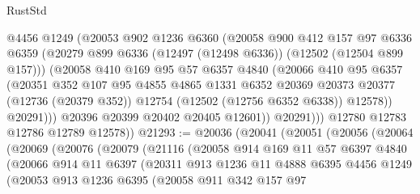 \begin{lexlean}{RustStd}
\begin{coremodule}
                  @4456
                  @1249
                  (@20053
                    @902
                    @1236
                    @6360
                    (@20058
                      @900
                      @412
                      @157
                      @97
                      @6336
                      @6359
                      (@20279 @899 @6336 (@12497 (@12498 @6336)) (@12502 (@12504 @899 @157)))
                      (@20058
                        @410
                        @169
                        @95
                        @57
                        @6357
                        @4840
                        (@20066
                          @410
                          @95
                          @6357
                          (@20351
                            @352
                            @107
                            @95
                            @4855
                            @4865
                            @1331
                            @6352
                            @20369
                            @20373
                            @20377
                            (@12736 (@20379 @352))
                            @12754
                            (@12502 (@12756 @6352 @6338))
                            @12578))
                        @20291)))
                  @20396
                  @20399
                  @20402
                  @20405
                  @12601))
              @20291)))
        @12780
        @12783
        @12786
        @12789
        @12578))
@21293 := @20036
    (@20041
      (@20051
        (@20056
          (@20064
            (@20069
              (@20076
                (@20079
                  (@21116
                    (@20058
                      @914
                      @169
                      @11
                      @57
                      @6397
                      @4840
                      (@20066
                        @914
                        @11
                        @6397
                        (@20311
                          @913
                          @1236
                          @11
                          @4888
                          @6395
                          @4456
                          @1249
                          (@20053
                            @913
                            @1236
                            @6395
                            (@20058
                              @911
                              @342
                              @157
                              @97

\end{coremodule}
\end{lexlean}
